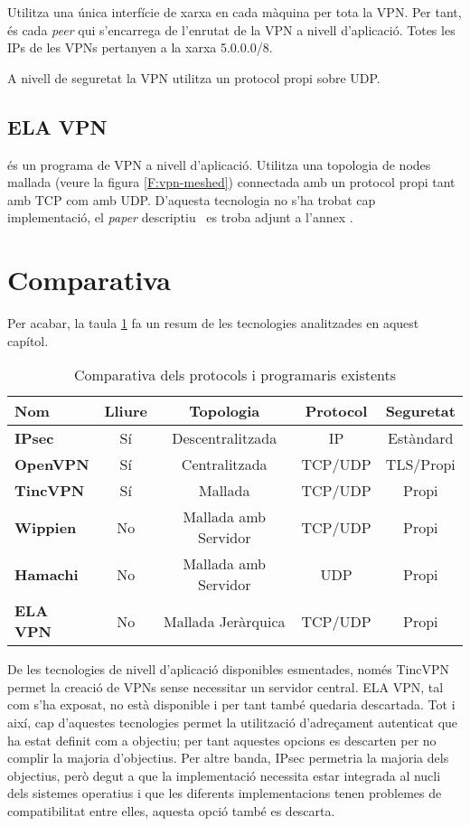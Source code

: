 Utilitza una única interfície de xarxa en cada màquina per tota la VPN. Per tant, és cada \emph{peer} qui s'encarrega de l'enrutat de la VPN a nivell d'aplicació. Totes les IPs de les VPNs pertanyen a la xarxa 5.0.0.0/8.

A nivell de seguretat la VPN utilitza un protocol propi sobre UDP.

\subsection{ELA VPN}
 és un programa de VPN a nivell d'aplicació.
Utilitza una topologia de nodes mallada (veure la figura \ref{F:vpn-meshed}) connectada amb un protocol propi tant amb TCP com amb UDP.
D'aquesta tecnologia no s'ha trobat cap implementació, el \emph{paper} descriptiu~\cite{ela} es troba adjunt a l'annex .

\section{Comparativa}
Per acabar, la taula \ref{T:statecomp} fa un resum de les tecnologies analitzades en aquest capítol.
\begin{table}[htb]
\begin{center}
\begin{tabular}{|l|c|c|c|c|}
\hline
Nom & Lliure & Topologia & Protocol & Seguretat \\ \hline \hline
\bf IPsec & Sí & Descentralitzada & IP & Estàndard \\ \hline
\bf OpenVPN & Sí & Centralitzada & TCP/UDP & TLS/Propi \\ \hline
\bf TincVPN & Sí & Mallada & TCP/UDP & Propi \\ \hline
\bf Wippien & No & Mallada amb Servidor & TCP/UDP & Propi \\ \hline
\bf Hamachi & No & Mallada amb Servidor & UDP & Propi \\ \hline
\bf ELA VPN & No & Mallada Jeràrquica & TCP/UDP & Propi \\ \hline
\end{tabular}
\end{center}
\begin{center}
\caption{Comparativa dels protocols i programaris existents}
\label{T:statecomp}
\end{center}
\end{table}

De les tecnologies de nivell d'aplicació disponibles esmentades, només TincVPN permet la creació de VPNs sense necessitar un servidor central. ELA VPN, tal com s'ha exposat, no està disponible i per tant també quedaria descartada. Tot i així, cap d'aquestes tecnologies permet la utilització d'adreçament autenticat que ha estat definit com a objectiu; per tant aquestes opcions es descarten per no complir la majoria d'objectius.
Per altre banda, IPsec permetria la majoria dels objectius, però degut a que la implementació necessita estar integrada al nucli dels sistemes operatius i que les diferents implementacions tenen problemes de compatibilitat entre elles, aquesta opció també es descarta.
